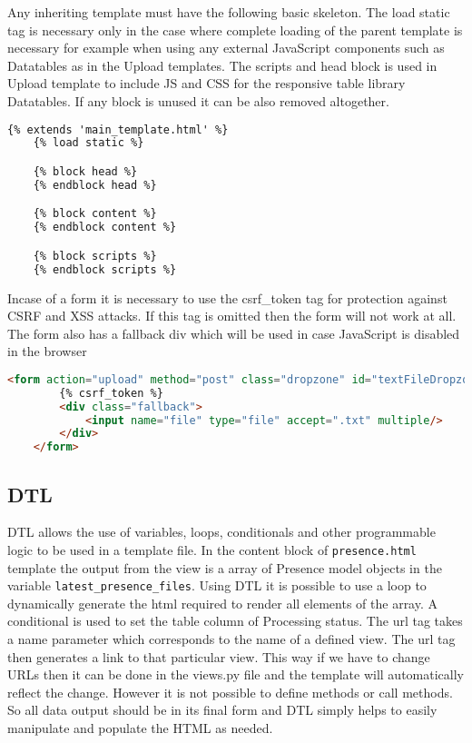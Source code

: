 Any inheriting template must have the following basic skeleton. The load static tag is necessary only in the case where 
complete loading of the parent template is necessary for example when using any external JavaScript components such as
Datatables\cite{static_dtl_tag} as in the Upload templates. The scripts and head block is used in Upload template to include JS and CSS for the 
responsive table library Datatables.\cite{datatables} If any block is unused it can be also removed altogether.
\begin{lstlisting}[language={HTML}]
	{% extends 'main_template.html' %}
	{% load static %}

	{% block head %}
	{% endblock head %}

	{% block content %}
	{% endblock content %}

	{% block scripts %}
	{% endblock scripts %}
\end{lstlisting}

Incase of a form it is necessary to use the csrf\_token tag for protection
against CSRF and XSS attacks. \cite{django_csrf_protection} If this tag is
omitted then the form will not work at all. The form also has a fallback div
which will be used in case JavaScript is disabled in the browser

\begin{lstlisting}[language={HTML}]
	<form action="upload" method="post" class="dropzone" id="textFileDropzone">
		{% csrf_token %}
		<div class="fallback">
			<input name="file" type="file" accept=".txt" multiple/>
		</div>
	</form>
\end{lstlisting}

\subsection{DTL}

DTL allows the use of variables, loops, conditionals and other programmable
logic to be used in a template file. In the content block of
\texttt{presence.html} template the output from the view is a array of Presence
model objects in the variable \texttt{latest\_presence\_files}. Using DTL it is
possible to use a loop to dynamically generate the html required to render all
elements of the array. A conditional is used to set the table column of
Processing status. The url tag takes a name parameter which corresponds to the
name of a defined view. The url tag then generates a link to that particular
view. This way if we have to change URLs then it can be done in the views.py
file and the template will automatically reflect the change. However it is not
possible to define methods or call methods. So all data output should be in its
final form and DTL simply helps to easily manipulate and populate the HTML as
needed.

